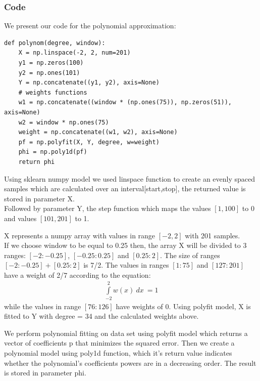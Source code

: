 \documentclass{article}
\begin{document}
\subsubsection{Code}
We present our code for the polynomial approximation:\\
\begin{lstlisting}
def polynom(degree, window):
    X = np.linspace(-2, 2, num=201)
    y1 = np.zeros(100)
    y2 = np.ones(101)
    Y = np.concatenate((y1, y2), axis=None)
    # weights functions
    w1 = np.concatenate((window * (np.ones(75)), np.zeros(51)), axis=None)
    w2 = window * np.ones(75)
    weight = np.concatenate((w1, w2), axis=None)
    pf = np.polyfit(X, Y, degree, w=weight)
    phi = np.poly1d(pf)
    return phi
\end{lstlisting}
\par Using sklearn numpy model we used linspace function to create an evenly spaced samples which are calculated over an interval[start,stop], the returned value is stored in parameter X.\\
Followed by parameter Y, the step function which maps the values \([1,100]\) to 0 and values \([101,201]\) to 1.
\par X represents a numpy array with values in range \([-2,2]\) with 201 samples.\\
If we choose window to be equal to 0.25 then, the array X will be divided to 3 ranges: \([-2:-0.25]\), \([-0.25:0.25]\) and \([0.25:2]\). The size of ranges \([-2:-0.25] + [0.25:2]\) is 7/2. The values in ranges \([1:75]\) and \([127:201]\) have a weight of 2/7 according to the equation:
\begin{equation}
\begin{split}
\int\limits_{-2}^2  w(x) \ dx\ = 1 
\end{split}
\end{equation}
while the values in range \([76:126]\) have weights of 0.
Using polyfit model, X is fitted to Y with degree = 34 and the calculated weights above.
\par We perform polynomial fitting on data set using polyfit model which returns a vector of coefficients p that minimizes the squared error. Then we create a polynomial model using poly1d function, which it's return value indicates whether the polynomial's coefficients powers are in a decreasing order.
The result is stored in parameter phi.
\end{document}
